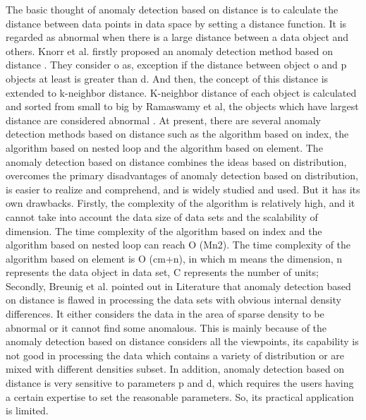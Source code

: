 The basic thought of anomaly detection based on
distance is to calculate the distance between data points in
data space by setting a distance function.
It is regarded as
abnormal when there is a large distance between a data
object and others.
Knorr et al.
firstly proposed an anomaly
detection method based on distance .
They consider o
as,
exception if the distance between object o and
p objects at least is greater than d.
And then,
the concept of
this distance is extended to k-neighbor distance.
K-neighbor
distance of each object is calculated and
sorted from small to big by Ramaswamy et al,
the objects which have largest
distance are considered abnormal .
At present,
there are several anomaly detection methods based on distance such as
the algorithm based on index,
the algorithm based on
nested loop and the algorithm based on element.
The anomaly detection based on distance combines the ideas
based on distribution,
overcomes the primary disadvantages
of anomaly detection based on distribution,
is easier to
realize and comprehend,
and is widely studied and used.
But it has its own drawbacks.
Firstly,
the complexity of the
algorithm is relatively high,
and it cannot take into account
the data size of data sets and the scalability of dimension.
The time complexity of the algorithm based on index and
the algorithm based on nested loop can reach O (Mn2).
The
time complexity of the algorithm based on element is O
(cm+n),
in which m means the dimension,
n represents the
data object in data set,
C represents the number of units;
Secondly,
Breunig et al.
pointed out in Literature that
anomaly detection based on distance is flawed in
processing the data sets with obvious internal density
differences.
It either considers the data in the area of sparse
density to be abnormal or it cannot find some anomalous.
This is mainly because of the anomaly detection based on
distance considers all the viewpoints,
its capability is not
good in processing the data which contains a variety of
distribution or are mixed with different densities subset.
In addition,
anomaly detection based on distance is very
sensitive to parameters p and d,
which requires the users
having a certain expertise to set the reasonable parameters.
So,
its practical application is limited.


